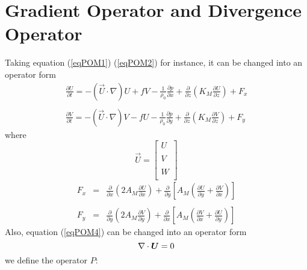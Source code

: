 \documentclass[oribibl]{llncs}
\begin{document}
\section{Gradient Operator and Divergence Operator}
Taking equation (\ref{eqPOM1}) (\ref{eqPOM2}) for instance, it can be changed into an operator form
 \begin{eqnarray}
 \frac{\partial U}{\partial t} = -(\vec{U}\cdot \nabla)U+fV - \frac{1}{\rho_0} \frac{\partial p}{\partial x} + \frac{\partial}{\partial z}  \left ( K_M \frac{\partial U}{\partial z} \right) + F_x \label{eqLater1} \\ \nonumber \\
  \frac{\partial V}{\partial t} = -(\vec{U}\cdot \nabla)V-fU - \frac{1}{\rho_0} \frac{\partial p}{\partial y} + \frac{\partial}{\partial z}  \left ( K_M \frac{\partial V}{\partial z} \right) + F_y
 \end{eqnarray}
 where
 \begin{equation}
\vec{U}=
\left[
  \begin{array}{c}
   U \\ \nonumber \\
   V \\ \\
   W \\ 
   \end{array}
\right] \nonumber
 \end{equation}
\begin{eqnarray}
F_x &=& \frac{\partial}{\partial x} \left ( 2A_M \frac{\partial U}{\partial x} \right ) + \frac{\partial}{\partial y} \left [ A_M \left ( \frac{\partial U}{\partial y} + \frac{\partial V}{\partial x} \right ) \right ] \nonumber \\ \nonumber \\
F_y &=& \frac{\partial}{\partial y} \left ( 2A_M \frac{\partial V}{\partial y} \right ) + \frac{\partial}{\partial x} \left [ A_M \left ( \frac{\partial V}{\partial x} + \frac{\partial U}{\partial y} \right ) \right ] \nonumber
\end{eqnarray}
Also, equation (\ref{eqPOM4}) can be changed into an operator form
\begin{equation}
\nabla \cdot \vec{U}=0 \label{eqLater2} \\ 
\end{equation}
we define the operator $P$:
\end{document}

